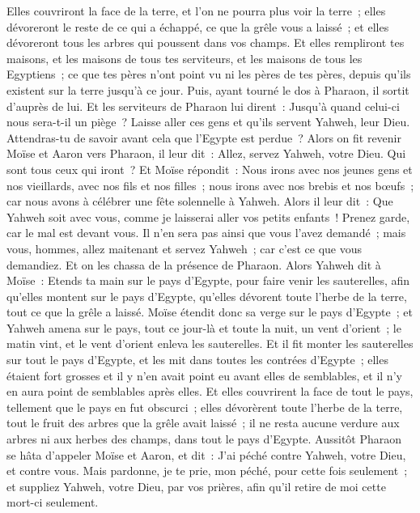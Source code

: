 \begin{multicols}{2}
Elles couvriront la face de la terre, et l'on ne pourra plus voir la terre~; elles dévoreront le reste de ce qui a échappé, ce que la grêle vous a laissé~; et elles dévoreront tous les arbres qui poussent dans vos champs.
Et elles rempliront tes maisons, et les maisons de tous tes serviteurs, et les maisons de tous les Egyptiens~; ce que tes pères n'ont point vu ni les pères de tes pères, depuis qu'ils existent sur la terre jusqu'à ce jour. Puis, ayant tourné le dos à Pharaon, il sortit d'auprès de lui.
Et les serviteurs de Pharaon lui dirent~: Jusqu'à quand celui-ci nous sera-t-il un piège~? Laisse aller ces gens et qu'ils servent Yahweh, leur Dieu. Attendras-tu de savoir avant cela que l'Egypte est perdue~?
Alors on fit revenir Moïse et Aaron vers Pharaon, il leur dit~: Allez, servez Yahweh, votre Dieu. Qui sont tous ceux qui iront~?
 Et Moïse répondit~: Nous irons avec nos jeunes gens et nos vieillards, avec nos fils et nos filles~; nous irons avec nos brebis et nos bœufs~; car nous avons à célébrer une fête solennelle à Yahweh.
Alors il leur dit~: Que Yahweh soit avec vous, comme je laisserai aller vos petits enfants~! Prenez garde, car le mal est devant vous.
Il n'en sera pas ainsi que vous l'avez demandé~; mais vous, hommes, allez maitenant et servez Yahweh~; car c'est ce que vous demandiez. Et on les chassa de la présence de Pharaon.
Alors Yahweh dit à Moïse~: Etends ta main sur le pays d'Egypte, pour faire venir les sauterelles, afin qu'elles montent sur le pays d'Egypte, qu'elles dévorent toute l'herbe de la terre, tout ce que la grêle a laissé.
Moïse étendit donc sa verge sur le pays d'Egypte~; et Yahweh amena sur le pays, tout ce jour-là et toute la nuit, un vent d'orient~; le matin vint, et le vent d'orient enleva les sauterelles.
Et il fit monter les sauterelles sur tout le pays d'Egypte, et les mit dans toutes les contrées d'Egypte~; elles étaient fort grosses et il y n'en avait point eu avant elles de semblables, et il n'y en aura point de semblables après elles.
Et elles couvrirent la face de tout le pays, tellement que le pays en fut obscurci~; elles dévorèrent toute l'herbe de la terre, tout le fruit des arbres que la grêle avait laissé~; il ne resta aucune verdure aux arbres ni aux herbes des champs, dans tout le pays d'Egypte.
Aussitôt Pharaon se hâta d'appeler Moïse et Aaron, et dit~: J'ai péché contre Yahweh, votre Dieu, et contre vous.
Mais pardonne, je te prie, mon péché, pour cette fois seulement~; et suppliez Yahweh, votre Dieu, par vos prières, afin qu'il retire de moi cette mort-ci seulement.

\end{multicols}
